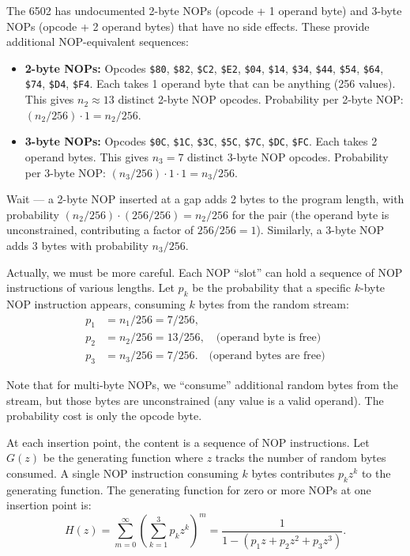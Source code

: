 \documentclass{article}
\newcommand{\hex}[1]{\texttt{\$#1}}
\begin{document}
The 6502 has undocumented 2-byte NOPs (opcode + 1 operand byte) and
3-byte NOPs (opcode + 2 operand bytes) that have no side effects.
These provide additional NOP-equivalent sequences:

\begin{itemize}
\item \textbf{2-byte NOPs:} Opcodes \hex{80}, \hex{82}, \hex{C2},
  \hex{E2}, \hex{04}, \hex{14}, \hex{34}, \hex{44}, \hex{54},
  \hex{64}, \hex{74}, \hex{D4}, \hex{F4}. Each takes 1 operand byte
  that can be anything (256 values). This gives $n_2 \approx 13$
  distinct 2-byte NOP opcodes.
  Probability per 2-byte NOP: $(n_2/256) \cdot 1 = n_2/256$.

\item \textbf{3-byte NOPs:} Opcodes \hex{0C}, \hex{1C}, \hex{3C},
  \hex{5C}, \hex{7C}, \hex{DC}, \hex{FC}. Each takes 2 operand bytes.
  This gives $n_3 = 7$ distinct 3-byte NOP opcodes.
  Probability per 3-byte NOP: $(n_3/256) \cdot 1 \cdot 1 = n_3/256$.
\end{itemize}

Wait --- a 2-byte NOP inserted at a gap adds 2 bytes to the program
length, with probability $(n_2/256) \cdot (256/256) = n_2/256$ for the
pair (the operand byte is unconstrained, contributing a factor of
$256/256 = 1$). Similarly, a 3-byte NOP adds 3 bytes with probability
$n_3/256$.

Actually, we must be more careful. Each NOP ``slot'' can hold a
sequence of NOP instructions of various lengths. Let $p_k$ be the
probability that a specific $k$-byte NOP instruction appears, consuming
$k$ bytes from the random stream:
\begin{align*}
  p_1 &= n_1 / 256 = 7/256, \\
  p_2 &= n_2 / 256 = 13/256, \quad \text{(operand byte is free)} \\
  p_3 &= n_3 / 256 = 7/256. \quad \text{(operand bytes are free)}
\end{align*}

Note that for multi-byte NOPs, we ``consume'' additional random bytes
from the stream, but those bytes are unconstrained (any value is a valid
operand). The probability cost is only the opcode byte.

At each insertion point, the content is a sequence of NOP instructions.
Let $G(z)$ be the generating function where $z$ tracks the number of
random bytes consumed. A single NOP instruction consuming $k$ bytes
contributes $p_k z^k$ to the generating function. The generating
function for zero or more NOPs at one insertion point is:
\[
  H(z) = \sum_{m=0}^{\infty} \left(\sum_{k=1}^{3} p_k z^k \right)^m
  = \frac{1}{1 - (p_1 z + p_2 z^2 + p_3 z^3)}.
\]
\end{document}
